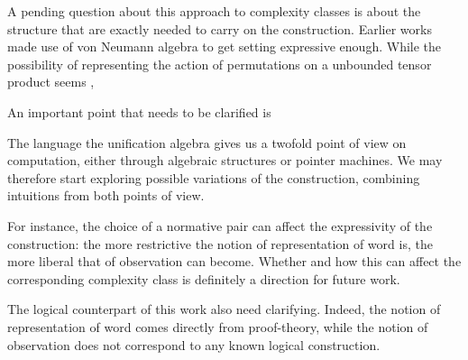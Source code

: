A pending question about this approach to complexity classes is about the structure that are exactly needed to carry on the construction. 
Earlier works made use of von Neumann algebra to get setting expressive enough. 
While the possibility of representing the action of permutations on a unbounded tensor product seems ,

\smallskip

An important point that needs to be clarified is 










\smallskip
The language the unification algebra gives us a twofold point of view on computation, either through algebraic structures or pointer machines. We may therefore start exploring possible variations of the construction, combining intuitions from both points of view.


\smallskip
For instance, the choice of a normative pair can affect the expressivity of the construction:
the more restrictive the notion of representation of word is, the more liberal that of observation can become.
Whether and how this can affect the corresponding complexity class is definitely a direction for future work.

\smallskip
The logical counterpart of this work also need clarifying. Indeed, the notion of representation of word comes directly from proof-theory, while the notion of observation does not correspond to any known logical construction.
